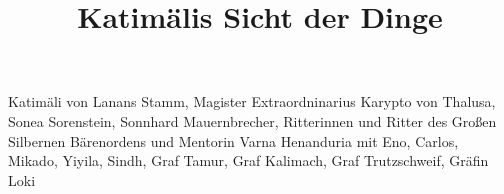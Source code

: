 \documentclass[a4paper]{scrartcl}
\title{Katimälis Sicht der Dinge}
\date{}
\newcommand{\name} [1]{{\color{blue}  #1}}
\begin{document}
\maketitle

\newpage











\vfill

Katimäli von Lanans Stamm, Magister Extraordninarius Karypto von Thalusa, Sonea Sorenstein, Sonnhard Mauernbrecher, Ritterinnen und Ritter des Großen Silbernen Bärenordens und Mentorin Varna Henanduria mit Eno, Carlos, Mikado, Yiyila, Sindh, Graf Tamur, Graf Kalimach, Graf Trutzschweif, Gräfin Loki
\newpage



\end{document}
